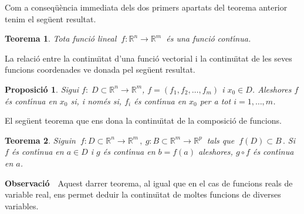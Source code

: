 \documentclass[12pt]{article}
\newcommand{\observacio}{\textbf{Observaci{\'o}}\ \ }
\newtheorem{teorema}{Teorema}[subsection]
\newtheorem{proposicio}{Proposici{\'o}}[subsection]
\newcommand{\R}{\mathbb{R}}
\begin{document}
\vspace{0.3cm}
Com a conseq{\"u}{\`e}ncia immediata dels dos primers apartats del teorema anterior tenim el seg{\"u}ent resultat.

\vspace{0.4cm}
\begin{teorema}
Tota funci{\'o} lineal $\ f:\R^n \longrightarrow\R^m\ $ {\'e}s una
funci{\'o} cont{\'\i}nua.
\end{teorema}

\vspace{0.3cm}
La relaci{\'o} entre la continu{\"\i}tat d'una funci{\'o} vectorial i
la continu{\"\i}tat de les seves funcions coordenades ve donada pel seg{\"u}ent resultat.

\vspace{0.4cm}
\begin{proposicio}
Sigui $f:\; D\subset \R^n \longrightarrow \R^m$, $f=(f_1,f_2,\ldots ,f_m)$ i $x_0\in D$.
Aleshores $f$  {\'e}s cont{\'\i}nua en $x_0$ si, i nom{\'e}s si, $f_i$  {\'e}s cont{\'\i}nua en $x_0$
per a tot $i=1,\ldots , m$.
\end{proposicio}




\vspace{0.3cm}
El seg{\"u}ent teorema que ens dona la continu{\"\i}tat de la composici{\'o} de funcions.

\vspace{0.4cm}
\begin{teorema}
Siguin  $\ f:D\subset \R^n \longrightarrow \R^m\,,\ g:B\subset \R^m \longrightarrow \R^p\ $ tals que $\ f(D)\subset B\,. $ Si $f$ {\'e}s
cont{\'\i}nua en $a\in D$ i $g$ {\'e}s cont{\'\i}nua en
$b=f(a)$ aleshores, $g\circ f$ {\'e}s cont{\'\i}nua en $a$.
\end{teorema}



\vspace{0.4cm}
\observacio Aquest darrer teorema, al igual que en el cas de
funcions reals de variable real, ens permet deduir la
continu{\"\i}tat de moltes funcions de diverses variables.
\end{document}

